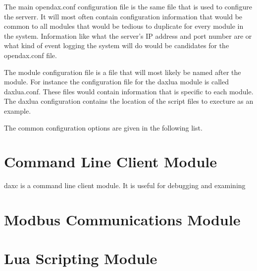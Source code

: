 \documentclass[letterpaper,10pt]{book}
\begin{document}
The main opendax.conf configuration file is the same file that is used to configure the serverr.  It will most often contain configuration information that would be common to all modules that would be tedious to duplicate for every module in the system.  Information like what the server's IP address and port number are or what kind of event logging the system will do would be candidates for the opendax.conf file.

The module configuration file is a file that will most likely be named after the module.  For instance the configuration file for the daxlua module is called daxlua.conf.  These files would contain information that is specific to each module.  The daxlua configuration contains the location of the script files to execture as an example.

The common configuration options are given in the following list.



\chapter*{Command Line Client Module}
daxc is a command line client module.  It is useful for debugging and examining

\chapter*{Modbus Communications Module}

\chapter*{Lua Scripting Module}
\end{document}
